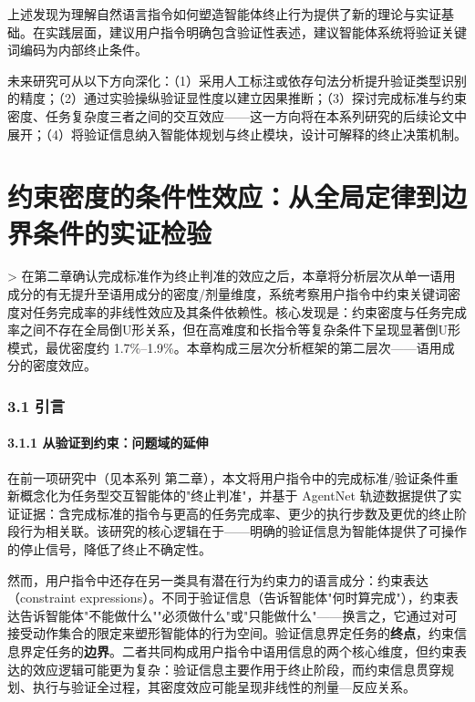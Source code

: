 \documentclass[12pt,a4paper,openany,oneside]{ctexrep}
\begin{document}
上述发现为理解自然语言指令如何塑造智能体终止行为提供了新的理论与实证基础。在实践层面，建议用户指令明确包含验证性表述，建议智能体系统将验证关键词编码为内部终止条件。

未来研究可从以下方向深化：（1）采用人工标注或依存句法分析提升验证类型识别的精度；（2）通过实验操纵验证显性度以建立因果推断；（3）探讨完成标准与约束密度、任务复杂度三者之间的交互效应——这一方向将在本系列研究的后续论文中展开；（4）将验证信息纳入智能体规划与终止模块，设计可解释的终止决策机制。


\newpage

\newpage

\chapter{约束密度的条件性效应：从全局定律到边界条件的实证检验}


> 在第二章确认完成标准作为终止判准的效应之后，本章将分析层次从单一语用成分的有无提升至语用成分的密度/剂量维度，系统考察用户指令中约束关键词密度对任务完成率的非线性效应及其条件依赖性。核心发现是：约束密度与任务完成率之间不存在全局倒U形关系，但在高难度和长指令等复杂条件下呈现显著倒U形模式，最优密度约 1.7\%–1.9\%。本章构成三层次分析框架的第二层次——语用成分的密度效应。


\subsection{3.1 引言}


\subsubsection{3.1.1 从验证到约束：问题域的延伸}


在前一项研究中（见本系列 第二章），本文将用户指令中的完成标准/验证条件重新概念化为任务型交互智能体的"终止判准"，并基于 AgentNet 轨迹数据提供了实证证据：含完成标准的指令与更高的任务完成率、更少的执行步数及更优的终止阶段行为相关联。该研究的核心逻辑在于——明确的验证信息为智能体提供了可操作的停止信号，降低了终止不确定性。

然而，用户指令中还存在另一类具有潜在行为约束力的语言成分：约束表达（constraint expressions）。不同于验证信息（告诉智能体"何时算完成"），约束表达告诉智能体"不能做什么""必须做什么"或"只能做什么"——换言之，它通过对可接受动作集合的限定来塑形智能体的行为空间。验证信息界定任务的\textbf{终点}，约束信息界定任务的\textbf{边界}。二者共同构成用户指令中语用信息的两个核心维度，但约束表达的效应逻辑可能更为复杂：验证信息主要作用于终止阶段，而约束信息贯穿规划、执行与验证全过程，其密度效应可能呈现非线性的剂量—反应关系。
\end{document}
